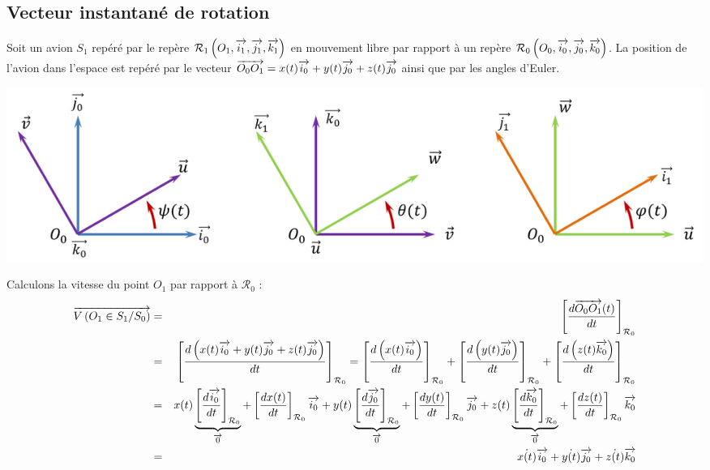 \documentclass[10pt,oneside]{article}
\begin{document}
\begin{exemple}
\end{exemple}

\subsection{Vecteur instantané de rotation}
Soit un avion $S_1$ repéré par le repère $\mathcal{R}_1\left(O_1,\overrightarrow{i_1},\overrightarrow{j_1},\overrightarrow{k_1} \right)$ en mouvement libre par rapport à un repère $\mathcal{R}_0\left(O_0,\overrightarrow{i_0},\overrightarrow{j_0},\overrightarrow{k_0} \right)$.  La position de l'avion dans l'espace est repéré par le vecteur $\overrightarrow{O_0O_1}=x(t)\overrightarrow{i_0}+y(t)\overrightarrow{j_0}+z(t)\overrightarrow{j_0}$ ainsi que par les angles d'Euler.

\begin{minipage}[c]{.65\linewidth}
\begin{center}
\includegraphics[width=.95\textwidth]{png/euler}
\end{center}
\end{minipage}\hfill
\begin{minipage}[c]{.3\linewidth}
\end{minipage}


Calculons la vitesse du point $O_1$ par rapport à $\mathcal{R}_0$ :
\begin{eqnarray*}
\overrightarrow{V\left( {O_1} \in {S_1}/{S_0}\right)} &=&  \left[\dfrac{d\overrightarrow{O_0 O_1}(t)}{dt}\right]_{\mathcal{R}_0} \\
&=& \left[\dfrac{d\left(x(t)\overrightarrow{i_0}+y(t)\overrightarrow{j_0}+z(t)\overrightarrow{j_0} \right)}{dt}\right]_{\mathcal{R}_0}
= 
\left[\dfrac{d\left(x(t)\overrightarrow{i_0}\right)}{dt}\right]_{\mathcal{R}_0}
+\left[\dfrac{d\left(y(t)\overrightarrow{j_0}\right)}{dt}\right]_{\mathcal{R}_0}
+\left[\dfrac{d\left(z(t)\overrightarrow{k_0}\right)}{dt}\right]_{\mathcal{R}_0} \\
&=&
x(t)\underbrace{\left[\dfrac{d\overrightarrow{i_0}}{dt}\right]_{\mathcal{R}_0}}_{\overrightarrow{0}}
+ \left[\dfrac{dx(t)}{dt}\right]_{\mathcal{R}_0} \overrightarrow{i_0}
+y(t)\underbrace{\left[\dfrac{d\overrightarrow{j_0}}{dt}\right]_{\mathcal{R}_0}}_{\overrightarrow{0}}
+ \left[\dfrac{dy(t)}{dt}\right]_{\mathcal{R}_0} \overrightarrow{j_0}
+z(t)\underbrace{\left[\dfrac{d\overrightarrow{k_0}}{dt}\right]_{\mathcal{R}_0}}_{\overrightarrow{0}} 
+ \left[\dfrac{dz(t)}{dt}\right]_{\mathcal{R}_0} \overrightarrow{k_0} \\
&= &\dot{x(t)}\overrightarrow{i_0}+\dot{y(t)}\overrightarrow{j_0}+\dot{z(t)}\overrightarrow{k_0}
\end{eqnarray*}
\end{document}
